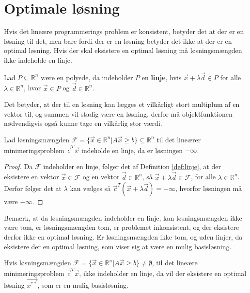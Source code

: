 \section{Optimale løsning}
\label{sec:eksistens}
Hvis det lineære programmerings problem er konsistent, betyder det at der er en løsning til det, men bare fordi der er en løsning betyder det ikke at der er en optimal løsning.
Hvis der skal eksistere en optimal løsning må løsningsmængden ikke indeholde en linje.
\begin{defn}[Linje]
Lad $P\subseteq \mathds{R}^n $ være en polyede, da indeholder $P$ en \textbf{linje}, hvis $\vec{x}+\lambda\vec{d} \in P$ for alle $\lambda \in \mathds{R}^n$, hvor $\vec{x}\in P$ og $\vec{d} \in \mathds{R}^n$.
\label{def:linje}
\end{defn}
Det betyder, at der til en løsning kan lægges et vilkårligt stort multiplum af en vektor til, og summen vil stadig være en løsning, derfor må objektfunktionen nødvendigvis også kunne tage en vilkårlig stor værdi.
\begin{prop}
Lad løsningsmængden $\mathcal{F} = \{ \vec{x} \in \mathds{R}^n| A \vec{x} \geq b \} \subseteq \mathds{R}^n $  til det lineærer minimeringsproblem $\vec{c}^T\vec{x}$ indeholde en linje, da er løsningen $-\infty$.
\end{prop}
\begin{proof}
Da $\mathcal{F}$ indeholder en linje, følger det af Definition \ref{def:linje}, at der eksistere en vektor $\vec{x} \in \mathcal{F}$ og en vektor $\vec{d} \in \mathds{R}^n$, så $\vec{x}+\lambda \vec{d} \in \mathcal{F}$, for alle $\lambda \in \mathds{R}^n$. 
Derfor følger det at $\lambda$ kan vælges så $\vec{c}^T(\vec{x}+\lambda\vec{d}) = - \infty$, hvorfor løsningen må være $-\infty$.
\end{proof}
Bemærk, at da løsningsmængden indeholder en linje, kan løsningsmængden ikke være tom, er løsningsmængden tom, er problemet inkonsistent, og der eksistere derfor ikke en optimal løsning. 
Er løsningsmængden ikke tom, og uden linjer, da eksistere der en optimal løsning, som viser sig at være en mulig basisløsning.
\begin{stn}
Hvis løsningsmængden $\mathcal{F} =\{\vec{x} \in \mathds{R}^n| A \vec{x} \geq b \} \neq \emptyset$, til det lineære minimeringsproblem $\vec{c}^T\vec{x}$, ikke indeholder en linje, da vil der eksistere en optimal løsning $\vec{x^{**}}$, som er en mulig basisløsning.
\label{stn:eksistens}
\end{stn}
